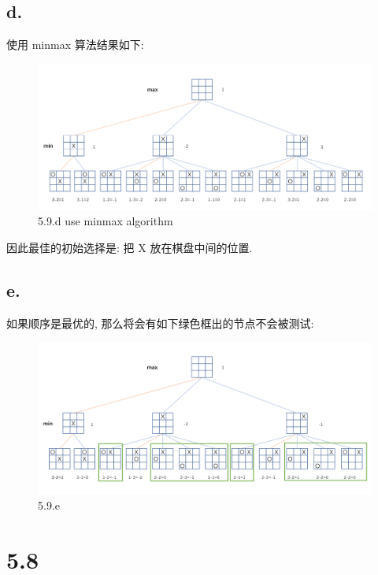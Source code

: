 \documentclass[UTF8]{article}
\begin{document}
\subsection*{d.}
使用 minmax 算法结果如下:
\begin{figure}[H]
	\centering
	\includegraphics[width=\linewidth]{image/5.9.d.png}
	\caption{5.9.d use minmax algorithm}
\end{figure}\par
因此最佳的初始选择是: 把 X 放在棋盘中间的位置.
\subsection*{e.}
如果顺序是最优的, 那么将会有如下绿色框出的节点不会被测试:
\begin{figure}[H]
	\centering
	\includegraphics[width=\linewidth]{image/5.9.e.png}
	\caption{5.9.e}
\end{figure}\par

\section*{5.8}
\end{document}
